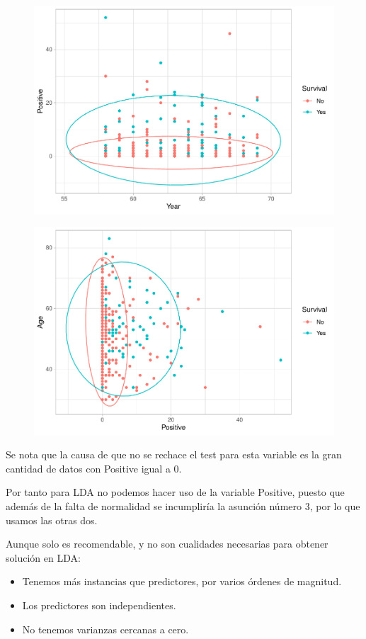 \begin{figure}[H]\center\includegraphics[width=.8\linewidth]{img/Clasificacion_files/figure-latex/unnamed-chunk-18-2}\caption{}\end{figure}

\begin{figure}[H]\center\includegraphics[width=.8\linewidth]{img/Clasificacion_files/figure-latex/unnamed-chunk-18-3}\caption{}\end{figure}

Se nota que la causa de que no se rechace el test para esta variable es la gran cantidad de datos con Positive igual a 0.

\vspace{\baselineskip}

Por tanto para LDA no podemos hacer uso de la variable Positive, puesto que además de la falta de normalidad se incumpliría la asunción número 3, por lo que usamos las otras dos.

\vspace{\baselineskip}

Aunque solo es recomendable, y no son cualidades necesarias para obtener solución en LDA:
\begin{itemize}
    \item Tenemos más instancias que predictores, por varios órdenes de magnitud.
    \item Los predictores son independientes. 
    \item No tenemos varianzas cercanas a cero.
\end{itemize}

